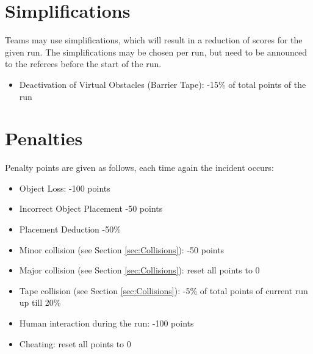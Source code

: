 \section{Simplifications}
Teams may use simplifications, which will result in a reduction of scores for the given run. The simplifications may be chosen per run, but need to be announced to the referees before the start of the run.

\begin{itemize}
  \item Deactivation of Virtual Obstacles (Barrier Tape): -15\% of total points of the run
\end{itemize}


\section{Penalties}
\label{sec:penalties}
Penalty points are given as follows, each time again the incident occurs:

\begin{itemize}
	\item Object Loss: \hfill -100 points
	\item Incorrect Object Placement \hfill -50 points
	\item Placement Deduction \hfill -50\%
	\item Minor collision (see Section \ref{sec:Collisions}): \hfill -50 points
	\item Major collision (see Section \ref{sec:Collisions}): \hfill reset all points to 0
  \item Tape collision (see Section \ref{sec:Collisions}): \hfill -5\% of total points of current run up till
  20\%
  \item Human interaction during the run: \hfill  -100 points
  \item Cheating: \hfill reset all points to 0
\end{itemize}


